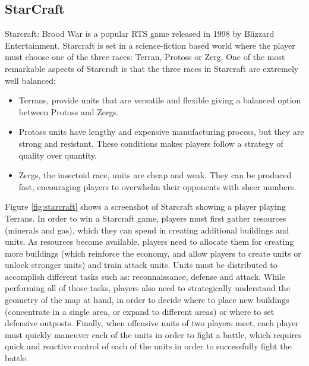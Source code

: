 \documentclass[journal]{IEEEtran}
\begin{document}
\subsection{StarCraft}\label{subsec:starcraft}

Starcraft: Brood War is a popular RTS game released in 1998 by Blizzard Entertainment. Starcraft is set in a science-fiction based world where the player must choose one of the three races: Terran, Protoss or Zerg. One of the most remarkable aspects of Starcraft is that the three races in Starcraft are extremely well balanced:

\begin{itemize}
	\item Terrans, provide units that are versatile and flexible giving a balanced option between Protoss and Zergs.
	\item Protoss units have lengthy and expensive manufacturing process, but they are strong and resistant. These conditions makes players follow a strategy of quality over quantity.
	\item Zergs, the insectoid race, units are cheap and weak. They can be produced fast, encouraging players to overwhelm their opponents with sheer numbers.
\end{itemize}


Figure \ref{fig:starcraft} shows a screenshot of Starcraft showing a player playing Terrans. In order to win a Starcraft game, players must first gather resources (minerals and gas), which they can spend in creating additional buildings and units. As resources become available, players need to allocate them for creating more buildings (which reinforce the economy, and allow players to create units or unlock stronger units) and train attack units. Units must be distributed to accomplish different tasks such as: reconnaissance, defense and attack. While performing all of those tasks, players also need to strategically understand the geometry of the map at hand, in order to decide where to place new buildings (concentrate in a single area, or expand to different areas) or where to set defensive outposts. Finally, when offensive units of two players meet, each player must quickly maneuver each of the units in order to fight a battle, which requires quick and reactive control of each of the units in order to successfully fight the battle. 
\end{document}
